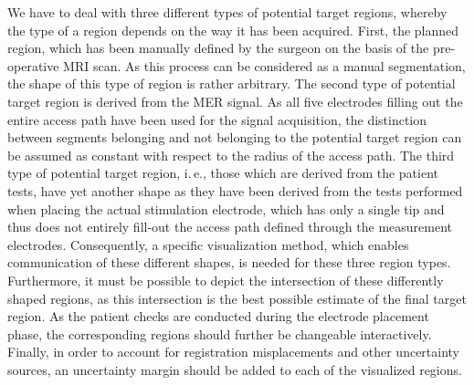 \documentclass[journal]{vgtc}                %
\begin{document}
We have to deal with three different types of potential target regions, whereby the type of a region depends on the way it has been acquired. First, the planned region, which has been manually defined by the surgeon on the basis of the pre-operative MRI scan. As this process can be considered as a manual segmentation, the shape of this type of region is rather arbitrary. The second type of potential target region is derived from the MER signal. As all five electrodes filling out the entire access path have been used for the signal acquisition, the distinction between segments belonging and not belonging to the potential target region can be assumed as constant with respect to the radius of the access path. The third type of potential target region, i.\,e., those which are derived from the patient tests, have yet another shape as they have been derived from the tests performed when placing the actual stimulation electrode, which has only a single tip and thus does not entirely fill-out the access path defined through the measurement electrodes. Consequently, a specific visualization method, which enables communication of these different shapes, is needed for these three region types. Furthermore, it must be possible to depict the intersection of these differently shaped regions, as this intersection is the best possible estimate of the final target region. As the patient checks are conducted during the electrode placement phase, the corresponding regions should further be changeable interactively. Finally, in order to account for registration misplacements and other uncertainty sources, an uncertainty margin should be added to each of the visualized regions.
\end{document}
